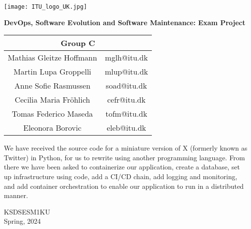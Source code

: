 \begin{titlepage}
        \vspace*{-7em}
        \hbox{\hspace{14em}\texttt{[image: ITU\_logo\_UK.jpg]}}
        \vspace*{4em}
    \begin{center}
        \centering 
        \vspace*{0.5cm}
        \LARGE
        \textbf{DevOps, Software Evolution and Software Maintenance: Exam Project}

        \vspace{1.5cm}
        
        \large
        \begin{center}
        \begin{tabular}{ |c|c| } 
        \hline
        \multicolumn{2}{|c|}{Group C}\\
        [0.5em]
        \hline
        Mathias Gleitze Hoffmann & mglh@itu.dk \\ 
        Martin Lupa Groppelli & mlup@itu.dk \\ 
        Anne Sofie Rasmussen & soad@itu.dk \\ 
        Cecilia Maria Fröhlich & cefr@itu.dk \\ 
        Tomas Federico Maseda & tofm@itu.dk \\ 
        Eleonora Borovic & eleb@itu.dk \\ 
        \hline
        \end{tabular}
        \end{center}
         
        \vspace{1cm}
        \normalsize

We have received the source code for a miniature version of X (formerly known as Twitter) in Python, for us to rewrite using another programming language. From there we have been asked to containerize our application, create a database, set up infrastructure using code, add a CI/CD chain, add logging and monitoring, and add container orchestration to enable our application to run in a distributed manner.

        \vfill

        
        KSDSESM1KU\\
        Spring, 2024
             
    \end{center}
\end{titlepage}